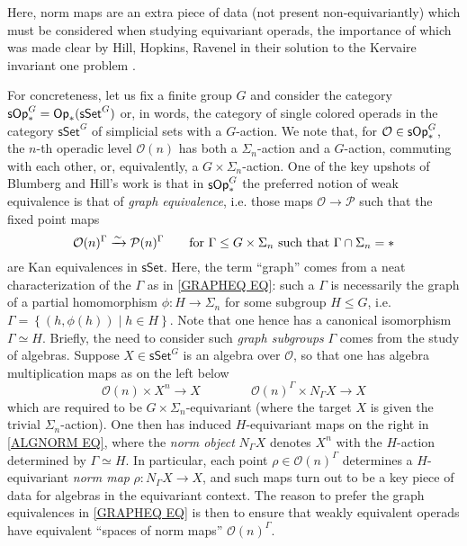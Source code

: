 \documentclass[a4paper,10pt
,draft
]{article}%
\numberwithin{equation}{section}
\numberwithin{figure}{section}
\theoremstyle{definition} %
\newcommand{\sets}[2]{\left\{ #1 \;|\; #2\right\}}%
\renewcommand{\O}{\ensuremath{\mathcal O}}
\newcommand{\1}{\ensuremath{\mathbbm 1}}%
\begin{document}






Here, norm maps are an extra piece of data 
(not present non-equivariantly)
which must be considered
when studying equivariant operads,
the importance of which was made clear by
Hill, Hopkins, Ravenel 
in their solution to the Kervaire invariant one problem \cite{HHR16}.


For concreteness, let us fix a finite group $G$
and consider the category
$\mathsf{sOp}^{G}_{\**} = \mathsf{Op}_{\**}(\mathsf{sSet}^G)$
or, in words,
the category of single colored operads
in the category $\mathsf{sSet}^G$
of simplicial sets with a $G$-action.
We note that, for $\O \in \mathsf{sOp}^{G}_{\**}$,
the $n$-th operadic level $\O(n)$ has both a $\Sigma_n$-action and a $G$-action, commuting with each other, or, equivalently, 
a $G \times \Sigma_n$-action.
One of the key upshots
of Blumberg and Hill's work \cite{BH15}
is that in $\mathsf{sOp}^{G}_{\**}$
the preferred notion of weak equivalence is that of \emph{graph equivalence},
i.e. those maps 
$\O \to \mathcal{P}$
such that the fixed point maps
\begin{equation}\label{GRAPHEQ EQ}
\O(n)^{\Gamma} \xrightarrow{\sim} \mathcal{P}(n)^{\Gamma}
\qquad
\text{for }
\Gamma \leq G \times \Sigma_n
\text{ such that }
\Gamma \cap \Sigma_n = \**
\end{equation}
are Kan equivalences in $\mathsf{sSet}$.
%
Here, the term ``graph'' comes from a neat characterization of the $\Gamma$
as in \eqref{GRAPHEQ EQ}:
such a $\Gamma$ is necessarily the graph of a partial homomorphism
$\phi \colon H \to \Sigma_n$ for some subgroup $H \leq G$,
i.e.
$\Gamma = \sets{(h,\phi(h))}{h \in H}$. 
Note that one hence has a canonical isomorphism $\Gamma \simeq H$.
%
Briefly, the need to consider such \emph{graph subgroups} $\Gamma$ comes from the study of algebras.
Suppose $X \in \mathsf{sSet}^G$ is an algebra over
$\O$,
so that one has algebra multiplication maps
as on the left below
\begin{equation}\label{ALGNORM EQ}
\O(n) \times X^n \to X
\qquad \qquad
\O(n)^{\Gamma} \times N_{\Gamma}X \to X
\end{equation}
which are required to be 
$G \times \Sigma_n$-equivariant
(where the target $X$ is given the trivial $\Sigma_n$-action).
One then has induced 
$H$-equivariant maps 
on the right in \eqref{ALGNORM EQ},
where the \emph{norm object} $N_{\Gamma} X$
denotes $X^{n}$ with the $H$-action determined by $\Gamma \simeq H$.
In particular, each point
$\rho \in \O(n)^{\Gamma}$
determines a $H$-equivariant \emph{norm map}
$\rho \colon N_{\Gamma} X \to X$,  
and such maps turn out to be a key piece of data
for algebras in the equivariant context.
The reason to prefer the graph equivalences in \eqref{GRAPHEQ EQ}
is then to ensure that weakly equivalent operads
have equivalent ``spaces of norm maps'' $\O(n)^{\Gamma}$.
\end{document}
